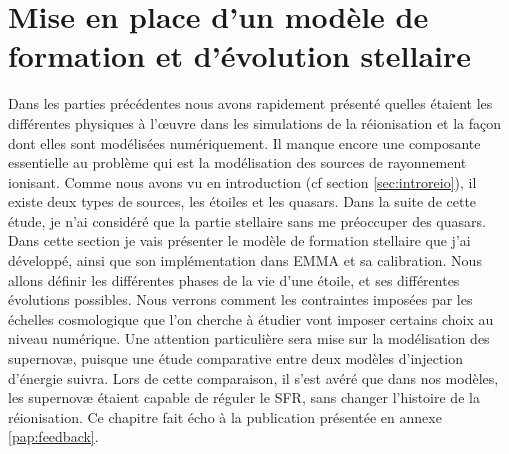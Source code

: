\chapter{Mise en place d'un modèle de formation et d'évolution stellaire}
\label{sec:etoiles}

Dans les parties précédentes nous avons rapidement présenté quelles étaient les différentes physiques à l’œuvre dans les simulations de la réionisation et la façon dont elles sont modélisées numériquement.
Il manque encore une composante essentielle au problème qui est la modélisation des sources de rayonnement ionisant.
Comme nous avons vu en introduction (cf section \ref{sec:introreio}), il existe deux types de sources, les étoiles et les quasars.
Dans la suite de cette étude, je n'ai considéré que la partie stellaire sans me préoccuper des quasars.
Dans cette section je vais présenter le modèle de formation stellaire que j'ai développé, ainsi que son implémentation dans EMMA et sa calibration.
Nous allons définir les différentes phases de la vie d'une étoile, et ses différentes évolutions possibles.
Nous verrons comment les contraintes imposées par les échelles cosmologique que l'on cherche à étudier vont imposer certains choix au niveau numérique.
Une attention particulière sera mise sur la modélisation des supernovæ, puisque une étude comparative entre deux modèles d'injection d'énergie suivra.
Lors de cette comparaison, il s'est avéré que dans nos modèles, les supernovæ étaient capable de réguler le \ac{SFR}, sans changer l'histoire de la réionisation.
Ce chapitre fait écho à la publication présentée en annexe \ref{pap:feedback}.
%


